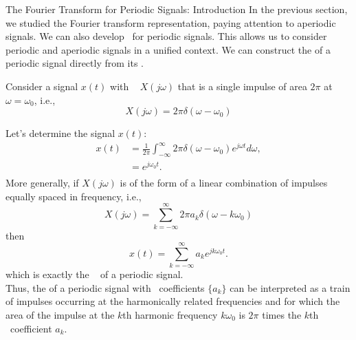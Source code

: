 \begin{frame}{The Fourier Transform for Periodic Signals: Introduction}
    In the previous section, we studied the Fourier transform representation, paying attention to aperiodic signals. We can also develop \ftrs~for periodic signals. This allows us to consider periodic and aperiodic signals in a unified context. We can construct the \ft of a periodic signal directly from its \fsr .

    Consider a signal $x(t)$  with \ft~ $X(j\omega)$ that is a single impulse of area $2\pi$ at $\omega=\omega_0$, i.e.,
{
    \begin{equation}
        X(j\omega) = 2\pi \delta(\omega-\omega_0)
    \end{equation}
}
\end{frame}

\begin{frame}
    Let's determine the signal $x(t)$:
    \pause
    {
        \begin{equation*}
            \begin{split}
                x(t) &= \frac{1}{2\pi}\int_{-\infty}^{\infty} 2\pi \delta(\omega-\omega_0)e^{j\omega t} d\omega,\\
                &= e^{j\omega_0 t}.\\
            \end{split}
        \end{equation*}
        \pause
        More generally, if $X(j\omega)$ is of the form of a linear combination of impulses equally spaced in frequency, i.e.,
        \begin{equation}
             X(j\omega) = \sum_{k=-\infty}^{\infty}2\pi a_k \delta(\omega-k\omega_0)
        \end{equation}
        \pause
        then
        \begin{equation}
            x(t) = \sum_{k=-\infty}^{\infty}a_ke^{jk\omega_0 t}.
        \end{equation}
        which is exactly the \fsr~ of a periodic signal. \\
        Thus, the \ft of a periodic signal with \fs~coefficients $\{a_k\}$ can be interpreted as a train of impulses occurring at the harmonically related frequencies and for which the area of the impulse at the $k$th harmonic frequency $k\omega_0$ is $2\pi$ times the $k$th \fs~coefficient $a_k$.
    }

\end{frame}


